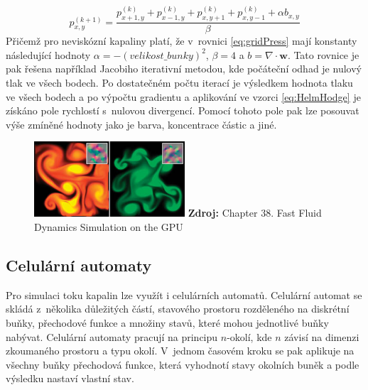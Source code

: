 \begin{equation}
	p_{x,y}^{(k+1)} = \frac{p_{x+1,y}^{(k)} + p_{x-1,y}^{(k)} + p_{x,y+1}^{(k)} + p_{x,y-1}^{(k)} + \alpha b_{x,y}}{\beta}
	\label{eq:gridPress}
\end{equation}
Přičemž pro neviskózní kapaliny platí, že v~rovnici \ref{eq:gridPress} mají konstanty následující hodnoty $\alpha = -( velikost\_bunky )^2$, $\beta = 4$ a $b = \nabla \cdot \mathbf{w}$. Tato rovnice je pak řešena například Jacobiho iterativní metodou, kde počáteční odhad je nulový tlak ve všech bodech. Po dostatečném počtu iterací je výsledkem hodnota tlaku ve všech bodech a po výpočtu gradientu a aplikování ve vzorci \ref{eq:HelmHodge} je získáno pole rychlostí s~nulovou divergencí. Pomocí tohoto pole pak lze posouvat výše zmíněné hodnoty jako je barva, koncentrace částic a jiné.
\cite{GPUGemsGridFLuid}

\begin{figure}[hbt]
	\centering
	\captionsetup{justification=centering}
	\includegraphics[width=0.5\textwidth]{obrazky-figures/GridFluid.jpg}
	\textbf{Zdroj: } Chapter 38. Fast Fluid Dynamics Simulation on the GPU \cite{GPUGemsGridFLuid}
	\label{fig:EulerFluid}
\end{figure}

\subsection{Celulární automaty}
Pro simulaci toku kapalin lze využít i celulárních automatů. Celulární automat se skládá z~několika důležitých částí, stavového prostoru rozděleného na diskrétní buňky, přechodové funkce a množiny stavů, které mohou jednotlivé buňky nabývat. Celulární automaty pracují na principu $n$-okolí, kde $n$ závisí na dimenzi zkoumaného prostoru a typu okolí. V~jednom časovém kroku se pak aplikuje na všechny buňky přechodová funkce, která vyhodnotí stavy okolních buněk a podle výsledku nastaví vlastní stav.

